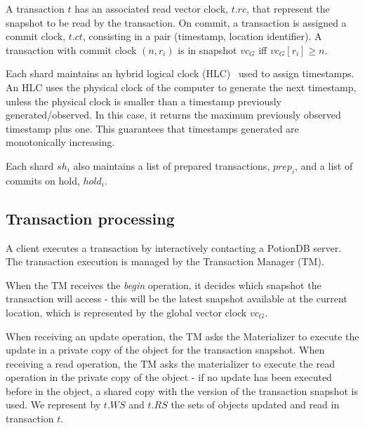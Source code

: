 \documentclass[sigplan,review,anonymous]{acmart}
\begin{document}
A transaction $t$ has an associated read vector clock, $t\!.\mathit{rc}$,  that represent the snapshot
to be read by the transaction. On commit, a transaction is assigned a commit clock, $t\!.\mathit{ct}$, consisting in a 
pair (timestamp, location identifier).  A transaction with commit clock $(n,r_i)$ is in snapshot $\mathit{vc}_G$ iff
$\mathit{vc}_G[r_i] \geq n$.

Each shard maintains an hybrid logical clock (HLC)~\cite{hlc} used to assign timestamps. An HLC uses the 
physical clock of the computer to generate the next timestamp, unless the physical clock is smaller than a timestamp
previously generated/observed. In this case, it returns the maximum previously observed timestamp plus one. 
This guarantees that timestamps generated are monotonically increasing.

Each shard $\mathit{sh}_i$ also maintains a list of prepared transactions, $\mathit{prep_i}$, and a list of commits on hold, $\mathit{hold}_i$.


\subsection{Transaction processing}
\label{subsec:txnproc}

A client executes a transaction by interactively contacting a PotionDB server.
The transaction execution is managed by the Transaction Manager (TM).

When the TM receives the \emph{begin} operation, it decides which snapshot the
transaction will access - this will be the latest snapshot available at the current location,
which is represented by the global vector clock $\mathit{vc}_G$.

When receiving an update operation, the TM asks the Materializer to execute the update in
a private copy of the object for the transaction snapshot. When receiving a read operation, 
the TM asks the materializer to execute the read operation in the private copy 
of the object - if no update has been executed before in the object, a shared copy with the version 
of the transaction snapshot is used. We represent by $t.WS$ and $t.RS$ the sets of objects updated 
and read in transaction $t$.
\end{document}
